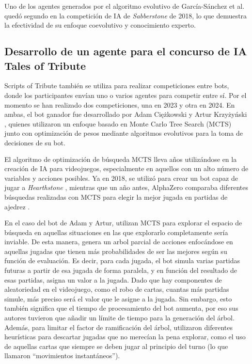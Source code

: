 Uno de los agentes generados por el algoritmo evolutivo de García-Sánchez et al. quedó segundo en la competición de IA de \textit{Sabberstone} de 2018, lo que demuestra la efectividad de su enfoque coevolutivo y conocimiento experto.

\subsection{Desarrollo de un agente para el concurso de IA Tales of Tribute}

Scripts of Tribute también se utiliza para realizar competiciones entre bots, donde los participantes envían uno o varios agentes para competir entre sí. Por el momento se han realizado dos competiciones, una en 2023 y otra en 2024. En ambas, el bot ganador fue desarrollado por Adam Ciężkowski y Artur Krzyżyński \cite{adam_ciezkowski_developing_2023}, quienes utilizaron un enfoque basado en Monte Carlo Tree Search (MCTS) junto con optimización de pesos mediante algoritmos evolutivos para la toma de decisiones de su bot. 

El algoritmo de optimización de búsqueda MCTS lleva años utilizándose en la creación de IA para videojuegos, especialmente en aquellos con un alto número de variables y acciones posibles. Ya en 2018, se utilizó para crear un bot capaz de jugar a \textit{Hearthstone} \cite{swiechowski_improving_2018}, mientras que un año antes, AlphaZero comparaba diferentes búsquedas realizadas con MCTS para elegir la mejor jugada en partidas de ajedrez \cite{silver_mastering_2017}.

En el caso del bot de Adam y Artur, utilizan MCTS para explorar el espacio de búsqueda en aquellas situaciones en las que explorarlo completamente sería inviable. De esta manera, genera un arbol parcial de acciones enfocándose en aquellas jugadas que tienen más probabilidades de ser las mejores según su función de evaluación. Es decir, para cada jugada, el bot simula varias partidas futuras a partir de esa jugada de forma paralela, y en función del resultado de esas partidas, asigna un valor a la jugada. Dado que hay componentes de aleatoriedad en el videojuego, como el robo de cartas, cuantas más partidas simule, más preciso será el valor que le asigne a la jugada. Sin embargo, esto también significa que el tiempo de procesamiento del bot aumenta, por eso sus autores tuvieron que añadir un límite de tiempo para la generación del árbol. Además, para limitar el factor de ramificación del árbol, utilizaron diferentes heurísticas para descartar jugadas que no merecían la pena explorar, como el uso de aquellas cartas que siempre se deben jugar al principio del turno (lo que llamaron ``movimientos instantáneos'').

